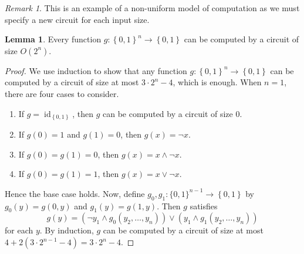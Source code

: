 \documentclass[10pt,letterpaper,cm]{nupset}
\theoremstyle{definition}
\theoremstyle{theorem}
\newtheorem{lemma}[definition]{Lemma}
\theoremstyle{remark}
\newtheorem{remark}[definition]{Remark}
\newcommand{\1}{\mathbf{1}}
\newcommand{\0}{\vec 0}
\DeclareMathOperator{\id}{id}
\begin{document}
\begin{remark}
This is an example of a non-uniform model of computation as we must specify a new circuit for each input size. 
\end{remark}

\begin{lemma}\label{pl1}
Every function $g: \left\{0,1\right\}^n \to \left\{0,1\right\}$ can be computed by a circuit of size $O\left(2^n\right)$. 
\end{lemma}
\begin{proof}
We use induction to show that any function $g:\left\{0,1\right\}^n \to \left\{0,1\right\}$ can be computed by a circuit of size at most $3 \cdot 2^n -4$, which is enough. When $n=1$, there are four cases to consider.
\begin{enumerate}[label=(\alph*)]
\item If $g= \id_{\left\{0,1\right\}}$, then $g$ can be computed by a circuit of size $0$.
\item If $g(0) =1$ and $g(1) =0$, then $g(x) = \neg{x}$.
\item If $g(0) = g(1) = 0$, then $g(x) = x \land \neg{x}$.
\item If $g(0) = g(1) = 1$, then $g(x) = x \vee \neg{x}$.
\end{enumerate}
Hence the base case holds. Now, define $g_0, g_1 : \{0,1 \}^{n-1} \to \left\{0,1\right\}$ by $g_0(y) = g(0, y)$ and $g_1(y) = g(1,y)$. Then $g$ satisfies $$g(y) = \left(\neg y_1 \land g_0(y_2, \ldots, y_n)\right) \vee \left(y_1 \land g_1(y_2, \ldots, y_n)\right)$$ for each $y$. By induction, $g$ can be computed by a circuit of size at most $4 + 2(3 \cdot 2^{n-1} -4) = 3 \cdot 2^n -4$. 
\end{proof}
\end{document}
